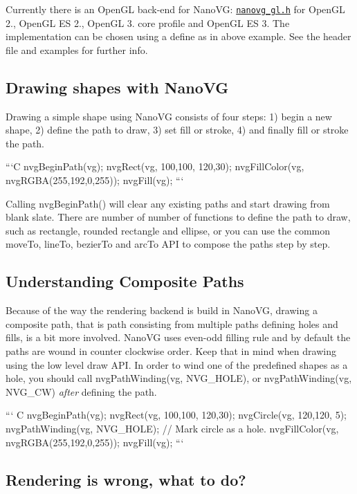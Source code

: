 Currently there is an Open\+G\+L back-\/end for Nano\+V\+G\+: \href{/src/nanovg_gl.h}{\tt nanovg\+\_\+gl.\+h} for Open\+G\+L 2., Open\+G\+L E\+S 2., Open\+G\+L 3. core profile and Open\+G\+L E\+S 3. The implementation can be chosen using a define as in above example. See the header file and examples for further info.

\subsection*{Drawing shapes with Nano\+V\+G}

Drawing a simple shape using Nano\+V\+G consists of four steps\+: 1) begin a new shape, 2) define the path to draw, 3) set fill or stroke, 4) and finally fill or stroke the path.

```\+C nvg\+Begin\+Path(vg); nvg\+Rect(vg, 100,100, 120,30); nvg\+Fill\+Color(vg, nvg\+R\+G\+B\+A(255,192,0,255)); nvg\+Fill(vg); ```

Calling {\ttfamily nvg\+Begin\+Path()} will clear any existing paths and start drawing from blank slate. There are number of number of functions to define the path to draw, such as rectangle, rounded rectangle and ellipse, or you can use the common move\+To, line\+To, bezier\+To and arc\+To A\+P\+I to compose the paths step by step.

\subsection*{Understanding Composite Paths}

Because of the way the rendering backend is build in Nano\+V\+G, drawing a composite path, that is path consisting from multiple paths defining holes and fills, is a bit more involved. Nano\+V\+G uses even-\/odd filling rule and by default the paths are wound in counter clockwise order. Keep that in mind when drawing using the low level draw A\+P\+I. In order to wind one of the predefined shapes as a hole, you should call {\ttfamily nvg\+Path\+Winding(vg, N\+V\+G\+\_\+\+H\+O\+L\+E)}, or {\ttfamily nvg\+Path\+Winding(vg, N\+V\+G\+\_\+\+C\+W)} {\itshape after} defining the path.

``` C nvg\+Begin\+Path(vg); nvg\+Rect(vg, 100,100, 120,30); nvg\+Circle(vg, 120,120, 5); nvg\+Path\+Winding(vg, N\+V\+G\+\_\+\+H\+O\+L\+E); // Mark circle as a hole. nvg\+Fill\+Color(vg, nvg\+R\+G\+B\+A(255,192,0,255)); nvg\+Fill(vg); ```

\subsection*{Rendering is wrong, what to do?}


